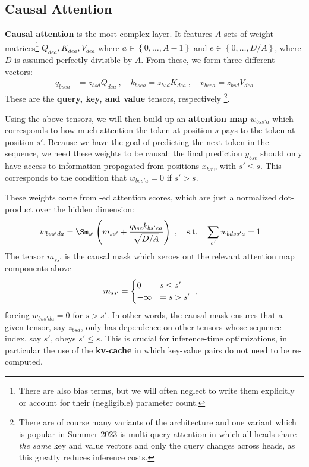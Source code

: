 \subsection{Causal Attention \label{subsubsec_attn_layer} }

\textbf{Causal attention} is the most complex layer. It features $ A $  sets of weight
matrices\footnote{There are also bias terms, but we will often neglect to write them explicitly or
    account for their (negligible)
	parameter count.}  $ Q  _{ d e a}, K  _{ de a}, V  _{ dea }  $
where $ a \in \left \{ 0, \ldots, A-1 \right \} $ and $ e \in \left \{ 0, \ldots, D/A \right \} $,
where $ D $ is assumed perfectly divisible by $ A $.
From these, we form three different vectors:
\begin{align}
	q _{ bsea } & = z _{ bsd } Q _{ dea } \ , \quad
	k _{ bsea } = z _{ bsd } K _{ dea }  \ , \quad
	v _{ bsea } = z _{ bsd } V _{ dea }
\end{align}
These are the \textbf{query, key, and value} tensors, respectively \footnote{There are of course
	many variants of the architecture and one variant which is popular in Summer 2023 is multi-query
	attention \cite{shazeer2019fast} in which all heads share \textit{the same} key and value vectors
	and only the query changes across heads, as this greatly reduces inference costs.}.

Using the above tensors, we will then build up an \textbf{attention map}  $ w _{ bss'a } $
which corresponds to how much attention the token at position $ s $ pays to the token at
position $ s' $.  Because we have the goal of predicting the
next token in the sequence, we need these weights to be causal: the final prediction $ y _{ bsv } $
should only have access to information propagated from positions $ x _{ bs'v } $ with $ s' \le s $.
This corresponds to the condition that $ w _{ bss'a} = 0  $ if  $ s' > s  $.

These weights come from -ed attention scores, which are just a normalized
dot-product over the hidden dimension:
\begin{align}
    w _{ bss'da } & =\Sm _{ s' } \left (m _{ s s' }+\frac{q _{ bse }k _{ bs'ea } }{ \sqrt{D/A}}  \right
	)\ ,  \quad {\rm s.t.} \quad \sum_{s'}w _{ bdss'a } =1
\end{align}
The tensor $ m _{  s s' } $ is the causal mask which zeroes out the relevant attention map
components above
\begin{align}
	m _{ s s' } & = \begin{cases}
		                0       & s \le s' \nonumber\\
		                -\infty & = s > s'
	                \end{cases}\ ,
\end{align}
forcing $ w  _{ bss'da } =0$ for $ s> s' $. In other words, the causal mask ensures that a
given tensor, say $ z _{ bsd } $, only has dependence on other tensors whose sequence index, say $
	s' $, obeys $ s' \le s $.  This is crucial for inference-time optimizations, in particular the use
of the \textbf{kv-cache} in which key-value pairs do not need to be re-computed.

